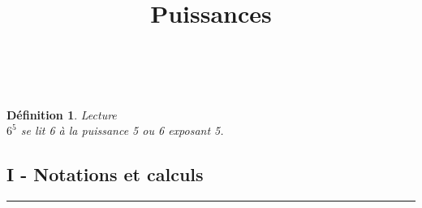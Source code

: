 \documentclass[10pt]{article}
\title{	
  \vspace{-6ex}
  \horrule{0.5pt} \\[0.4cm] %
  \huge Puissances \\ %
  \horrule{2pt} \\[0.5cm] %
}
\author{}
\date{\vspace{-10ex}} %
\newcommand{\horrule}[1]{\rule{\linewidth}{#1}} %
\begin{document}

\newtheorem{Definition}{Définition}
\newtheorem{Theorem}{Théorème}
\newtheorem{Proposition}{Propriété}

\renewcommand{\labelitemi}{$\bullet$}
\renewcommand{\labelitemii}{$\circ$}
\setlength{\columnseprule}{1pt}

\maketitle %

\vspace{-4ex}

\begin{multicols}{2}

  \begin{Definition}{Lecture}\\
    $6^5$ se lit 6 à la puissance 5 ou 6 exposant 5.
  \end{Definition}
  
  \subsection*{I - Notations et calculs}
  
\end{multicols}

\horrule{0.5px}
\end{document}
